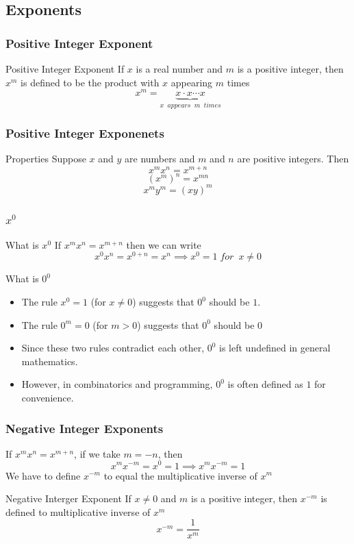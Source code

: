 \documentclass{beamer}
\begin{document}
\subsection{Exponents}
\begin{frame}
  \frametitle{Positive Integer Exponent}
  \begin{block}{Positive Integer Exponent}
    If \(x\) is a real number and \(m\) is a positive integer, then \(x^{m}\) is defined to be the
product with \(x\) appearing \(m\) times
\[x^{m} = \underset{x \;\;appears\;\;m \;\;times}{\underbrace{x \cdot x \cdots x }}\]
    
  \end{block}
\end{frame}

\begin{frame}
  \frametitle{Positive Integer Exponenets}
  \begin{block}{Properties}
    Suppose \(x\) and \(y\) are numbers and \(m\) and \(n\) are positive integers. Then 
    \[x^{m}x^{n} = x^{m+n} \]   
    \[\left(x^{m}\right)^{n} = x^{mn} \] 
    \[x^{m}y^{m} = \left(xy\right)^{m} \] 
  \end{block}
\end{frame}
\begin{frame}
  \frametitle{\(x^{0}\)} 
  \begin{alertblock}{What is \(x^{0}\)}
    If  \(x^{m}x^{n} = x^{m+n}\) then we can write \[x^{0}x^{n} = x^{0+n} = x^{n} \implies x^{0} = 1\;for\;\ x \neq 0\]
   \end{alertblock}

   \begin{alertblock}{What is \(0^{0}\)}
    \begin{itemize}
      \item The rule \( x^0 = 1 \) (for \( x \neq 0 \)) suggests that \( 0^0 \) should be \(1\).
      \item The rule \( 0^m = 0 \) (for \( m > 0 \)) suggests that \( 0^0 \) should be \(0\)
      \item Since these two rules contradict each other, \( 0^0 \) is left undefined in general mathematics.
      \item However, in combinatorics and programming, \( 0^0 \) is often defined as \(1\) for convenience.
  \end{itemize}
   \end{alertblock}
\end{frame}

\begin{frame}
  \frametitle{Negative Integer Exponents}
  If \(x^{m}x^{n} = x^{m+n}\), if we take \(m = -n \), then 
  \[x^{m}x^{-m} = x^{0} = 1 \implies x^{m}x^{-m} = 1\]
  We have to define \(x^{-m}\) to equal the multiplicative inverse of \(x^{m}\)
\begin{block}{Negative Interger Exponent}
  If \(x \neq 0\) and \(m\) is a positive integer, then \(x^{-m}\) is defined to multiplicative inverse of \(x^{m}\) 
  \[x^{-m} = \frac{1}{x^{m}}\]
  
\end{block}
\end{frame}
\end{document}
